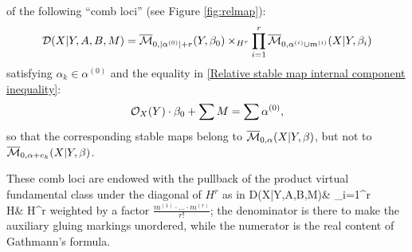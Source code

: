    of the following ``comb loci'' (see Figure \ref{fig:relmap}):
\[\mathcal D(X|Y,A,B,M)=\overline{\mathcal{M}}_{0,\lvert\alpha^{(0)}\rvert+r}(Y,\beta_0)\times_{H^r}\prod_{i=1}^r
\overline{\mathcal{M}}_{0,\alpha^{(i)}\cup m^{(i)}}(X|Y,\beta_i)\]
satisfying $\alpha_k\in\alpha^{(0)}$ and the equality in \eqref{Relative stable map internal component inequality}:
\[\mathcal{O}_X(Y)\cdot\beta_0+\sum M=\sum \alpha^{(0)},\]
so that the corresponding stable maps belong to $\overline{\mathcal{M}}_{0,\alpha}(X|Y,\beta)$, but not to $\overline{\mathcal{M}}_{0,\alpha+e_k}(X|Y,\beta)$.

These comb loci are endowed with the pullback of the product virtual fundamental class under the diagonal of $H^r$ as in
\bcd
\mathcal D(X|Y,A,B,M)\ar[r]\ar[d] & \times\prod_{i=1}^r
\ar[d,"\ev"] \\
H\ar[r,"\Delta"] & H^r
\ecd
weighted by a factor $\frac{m^{(1)}\cdot\ldots\cdot m^{(r)}}{r!}$; the denominator is there to make the auxiliary gluing markings unordered, while the numerator is the real content of Gathmann's formula.

